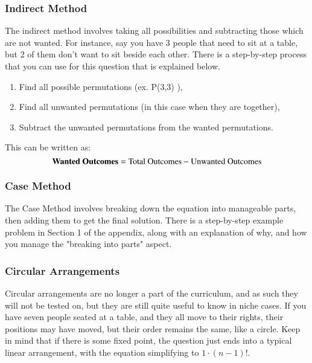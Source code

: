 \documentclass[final,1p,12pt]{elsarticle}
\begin{document}
        \subsubsection{Indirect Method}
        The indirect method involves taking all possibilities and subtracting those which are not wanted.
        For instance, say you have 3 people that need to sit at a table, but 2 of them don't want to sit beside each other.
        There is a step-by-step process that you can use for this question that is explained below.
        \begin{enumerate}
                \item Find all possible permutations (ex. P(3,3) ),
                \item Find all unwanted permutations (in this case when they are together),
                \item Subtract the unwanted permutations from the wanted permutations.
            \end{enumerate}
        This can be written as:
        \begin{equation*}
            \mbox{\textbf{Wanted Outcomes}} = \mbox{Total Outcomes}-\mbox{Unwanted Outcomes}
        \end{equation*}
    
        \subsubsection{Case Method}
        The Case Method involves breaking down the equation into manageable parts, then adding them to get the final solution.
        There is a step-by-step example problem in Section 1 of the appendix, along with an explanation of why, and how you manage the "breaking into parts" aspect.
    
        \subsubsection{Circular Arrangements}
        Circular arrangements are no longer a part of the curriculum, and as such they will not be tested on, but they are still quite useful to know in niche cases.
        If you have seven people seated at a table, and they all move to their rights, their positions may have moved, but their order remains the same, like a circle.
        Keep in mind that if there is some fixed point, the question just ends into a typical linear arrangement, with the equation simplifying to $1 \cdot (n-1)!$.
       
\end{document}
